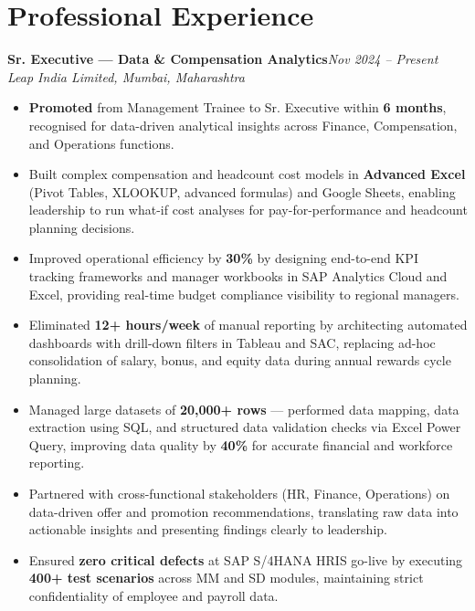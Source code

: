 \documentclass[10pt, letterpaper]{article}
\newcommand{\role}[3]{%
  \vspace{2pt}%
  {\bfseries #1}\hfill{\small\color{muted}\textit{#3}}\\[-2pt]%
  {\small\color{muted}\textit{#2}}%
}
\begin{document}
\section{Professional Experience}

\role{Sr. Executive — Data \& Compensation Analytics}{Leap India Limited, Mumbai, Maharashtra}{Nov 2024 – Present}

\begin{itemize}
  \item \textbf{Promoted} from Management Trainee to Sr. Executive within \textbf{6 months}, recognised for data-driven analytical insights across Finance, Compensation, and Operations functions.
  \item Built complex compensation and headcount cost models in \textbf{Advanced Excel} (Pivot Tables, XLOOKUP, advanced formulas) and Google Sheets, enabling leadership to run what-if cost analyses for pay-for-performance and headcount planning decisions.
  \item Improved operational efficiency by \textbf{30\%} by designing end-to-end KPI tracking frameworks and manager workbooks in SAP Analytics Cloud and Excel, providing real-time budget compliance visibility to regional managers.
  \item Eliminated \textbf{12+ hours/week} of manual reporting by architecting automated dashboards with drill-down filters in Tableau and SAC, replacing ad-hoc consolidation of salary, bonus, and equity data during annual rewards cycle planning.
  \item Managed large datasets of \textbf{20,000+ rows} — performed data mapping, data extraction using SQL, and structured data validation checks via Excel Power Query, improving data quality by \textbf{40\%} for accurate financial and workforce reporting.
  \item Partnered with cross-functional stakeholders (HR, Finance, Operations) on data-driven offer and promotion recommendations, translating raw data into actionable insights and presenting findings clearly to leadership.
  \item Ensured \textbf{zero critical defects} at SAP S/4HANA HRIS go-live by executing \textbf{400+ test scenarios} across MM and SD modules, maintaining strict confidentiality of employee and payroll data.
\end{itemize}

\vspace{1pt}
\end{document}
